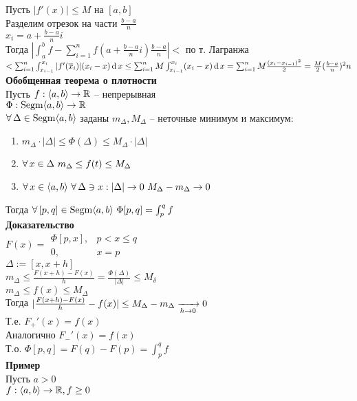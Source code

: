 \documentclass[12pt]{article}
\begin{document}
Пусть $|f'(x)| \leq M$ на $[a,b]$\\
Разделим отрезок на части $\frac{b-a}n$\\
$x_i = a + \frac{b-a}ni$\\
Тогда $|\int_a^b f - \sum_{i=1}^n f(a+\frac{b-a}ni)\frac{b-a}n| < $ по т. Лагранжа $ < \sum_{i=1}^n \int_{x_{i-1}}^{x_i} |f'(\overline x_i)|(x_i-x) \operatorname{d} x \leq \sum_{i=1}^n M\int_{x_{i-1}}^{x_i} (x_i-x)\operatorname{d} x = \sum_{i=1}^n M\frac{(x_i-x_{i-1})^2}2 = \frac M2 (\frac{b-a}n)^2 n$\\
\textbf{Обобщенная теорема о плотности}\\
Пусть $f: \langle a, b \rangle \rightarrow \mathbb{R}$ -- непрерывная\\
$\Phi: \operatorname{Segm}\langle a, b \rangle \rightarrow \mathbb{R}$\\
$\forall\, \Delta \in \operatorname{Segm}\langle a, b \rangle$ заданы $m_\Delta, M_\Delta$ -- неточные минимум и максимум:
\begin{enumerate}
    \item $m_\Delta\cdot|\Delta| \leq \Phi(\Delta) \leq M_\Delta\cdot|\Delta|$
    \item $\forall\, x \in \Delta\ m_\Delta \leq f(t) \leq M_\Delta$
    \item $\forall\, x \in \langle a, b \rangle\ \forall\, \Delta \ni x: |\Delta| \rightarrow 0\ M_\Delta-m_\Delta \rightarrow 0$\\
\end{enumerate}
Тогда $\fall [p,q] \in \nm{Segm}\an ab\ \Phi[p,q] = \int_p^q f$\\
\textbf{Доказательство}\\
$F(x) = \left.\begin{array}{ll}
   \Phi[p,x],  & p < x \leq q \\
    0, & x=p
\end{array}\right.$\\
$\Delta := [x,x+h]$\\
$m_\Delta \leq \frac{F(x+h)-F(x)}{h} = \frac{\Phi(\Delta)}{|\Delta|} \leq M_\delta$\\
$m_\Delta \leq f(x) \leq M_\Delta$\\
Тогда $| \frac{F(x+h)-F(x)}h - f(x)| \leq M_\Delta - m_\Delta \xrightarrow[h\rightarrow 0]{} 0$\\
Т.е. $F_+'(x) = f(x)$\\
Аналогично $F_-'(x) = f(x)$\\
Т.о. $\Phi[p,q] = F(q)-F(p) = \int_p^q f$\\
\textbf{Пример}\\
Пусть $a > 0$\\
$f: \langle a, b \rangle \rightarrow \mathbb{R}, f \geq 0$\\
\end{document}
